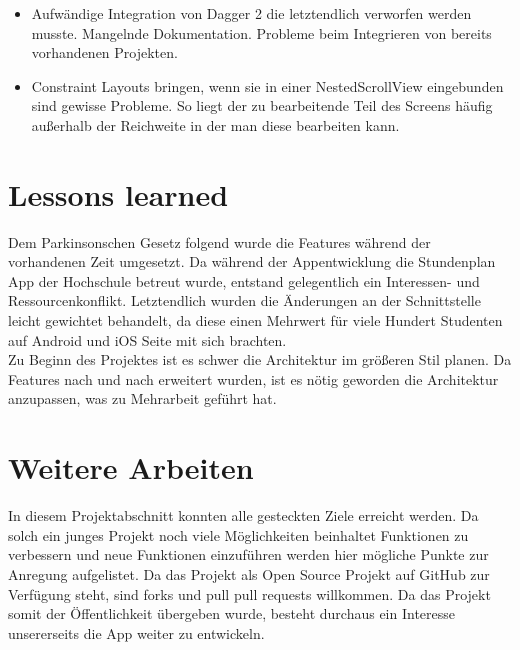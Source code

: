 \documentclass[
    DIV12,
    cleardouble=plain,
    headings=normal,
    pdftex,
    headexclude,footexclude,
    final
]{scrreprt}
\begin{document}
\begin{itemize}
\item Aufwändige Integration von Dagger 2 die letztendlich verworfen werden musste. Mangelnde Dokumentation. Probleme beim Integrieren von bereits vorhandenen Projekten.
\item Constraint Layouts bringen, wenn sie in einer NestedScrollView eingebunden sind gewisse Probleme. So liegt der zu bearbeitende Teil des Screens häufig außerhalb der Reichweite in der man diese bearbeiten kann.
\end{itemize}

\newpage

\chapter{Lessons learned}
Dem Parkinsonschen Gesetz folgend wurde die Features während der vorhandenen Zeit umgesetzt. Da während der Appentwicklung die Stundenplan App der Hochschule betreut wurde, entstand gelegentlich ein Interessen- und Ressourcenkonflikt. Letztendlich wurden die Änderungen an der Schnittstelle leicht gewichtet behandelt, da diese einen Mehrwert für viele Hundert Studenten auf Android und iOS Seite mit sich brachten.\\

Zu Beginn des Projektes ist es schwer die Architektur im größeren Stil planen. Da Features nach und nach erweitert wurden, ist es nötig geworden die Architektur anzupassen, was zu Mehrarbeit geführt hat.


\newpage

\chapter{Weitere Arbeiten}
In diesem Projektabschnitt konnten alle gesteckten Ziele erreicht werden. Da solch ein junges Projekt noch viele Möglichkeiten beinhaltet Funktionen zu verbessern und neue Funktionen einzuführen werden hier mögliche Punkte zur Anregung aufgelistet. Da das Projekt als Open Source Projekt auf GitHub zur Verfügung steht, sind forks und pull pull requests willkommen. Da das Projekt somit der Öffentlichkeit übergeben wurde, besteht durchaus ein Interesse unsererseits die App weiter zu entwickeln.





\newpage


\listoffigures
\end{document}
